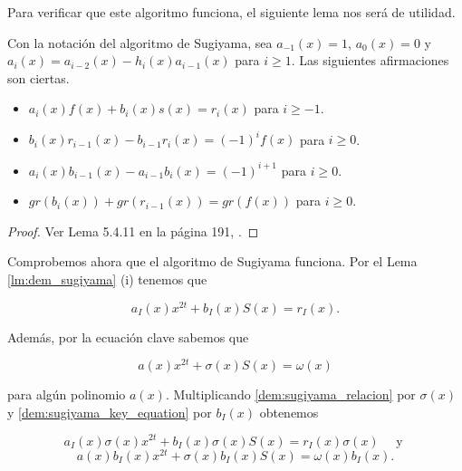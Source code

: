 Para verificar que este algoritmo funciona, el siguiente lema nos será de utilidad.

\begin{lemma}
    \label{lm:dem_sugiyama}
    Con la notación del algoritmo de Sugiyama, sea $a_{-1}(x) = 1$, $a_0(x) = 0$ y $a_i(x) = a_{i-2}(x) - h_i(x) a_{i-1}(x)$ para $i \geq 1$. Las siguientes afirmaciones son ciertas.

    \begin{itemize}
        \item $a_i(x) f(x) + b_i(x) s(x) = r_i (x)$ para $i \geq -1$.
        \item $b_i(x) r_{i-1}(x) - b_{i-1} r_i(x) = (-1)^i f(x)$ para $i \geq 0$.
        \item $a_i(x) b_{i-1}(x) - a_{i-1} b_i (x) = (-1)^{i+1}$ para $i \geq 0$.
        \item $gr(b_i(x)) + gr(r_{i-1}(x)) = gr(f(x))$ para $i \geq 0$.
    \end{itemize}
\end{lemma}

\begin{proof}
    Ver Lema 5.4.11 en la página 191, \cite{Huffman_Pless_2010}.
\end{proof}

Comprobemos ahora que el algoritmo de Sugiyama funciona. Por el Lema \ref{lm:dem_sugiyama} (i) tenemos que

\begin{equation}
    \label{dem:sugiyama_relacion}
    a_I(x) x^{2t} + b_I(x) S(x) = r_I(x).
\end{equation}

Además, por la ecuación clave sabemos que

\begin{equation}
    \label{dem:sugiyama_key_equation}
    a(x) x^{2t} + \sigma(x) S(x) = \omega(x)
\end{equation}

para algún polinomio $a(x)$. Multiplicando \ref{dem:sugiyama_relacion} por $\sigma(x)$ y \ref{dem:sugiyama_key_equation} por $b_I(x)$ obtenemos 

\begin{equation}
    \label{dem:sugiyama_relacion_sigma}
    a_I(x) \sigma(x) x^{2t}  + b_I(x) \sigma(x) S(x) = r_I(x) \sigma(x) \quad \text{ y }
\end{equation}
\begin{equation}
    \label{dem:sugiyama_key_equation_b_I}
    a(x) b_I(x) x^{2t} + \sigma(x) b_I(x) S(x) = \omega(x) b_I(x).
\end{equation}

